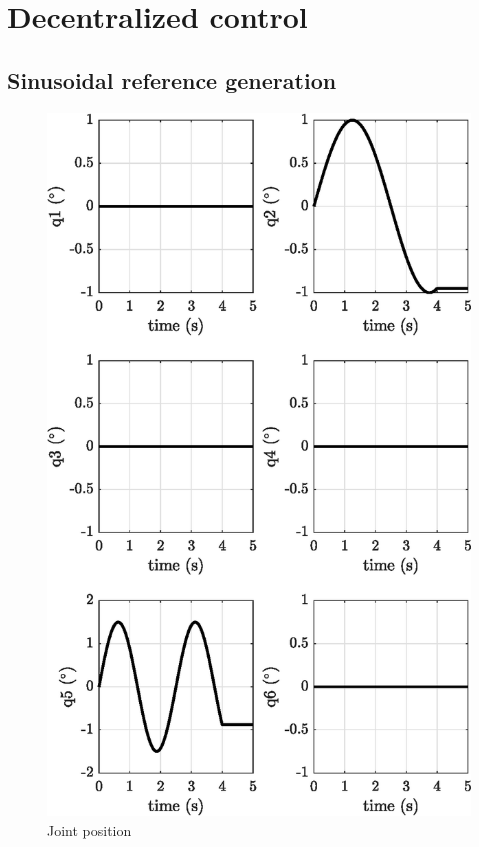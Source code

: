 \documentclass[12pt, a4paper]{article}
\begin{document}
\maketitle
\newpage
\section{Decentralized control}
\subsection{Sinusoidal reference generation}
\begin{figure}
    \centering
    \includegraphics{images/exp1.1/joint_position.eps}
    \caption{Joint position}
    \label{fig:joint_position}
\end{figure}
\end{document}
